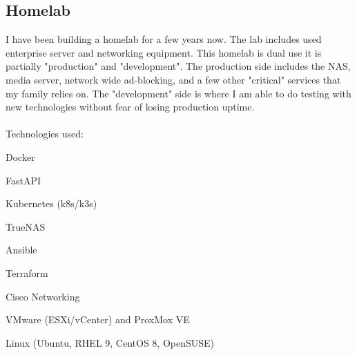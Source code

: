 \documentclass[a4paper,10pt]{article}
\begin{document}
\subsection*{Homelab}
I have been building a homelab for a few years now. The lab includes used enterprise server and networking equipment. This homelab is dual use it is partially "production" and "development". The production side includes the NAS, media server, network wide ad-blocking, and a few other "critical" services that my family relies on. The "development" side is where I am able to do testing with new technologies without fear of losing production uptime. 
\\
\\
Technologies used:
\begin{itemize}
    \begin{multicols}{2}
    \item Docker
    \item FastAPI
    \item Kubernetes (k8s/k3s)
    \item TrueNAS
    \item Ansible
    \item Terraform
    \item Cisco Networking
    \item VMware (ESXi/vCenter) and ProxMox VE
    \item Linux (Ubuntu, RHEL 9, CentOS 8, OpenSUSE)
    \end{multicols}
\end{itemize}
\end{document}
